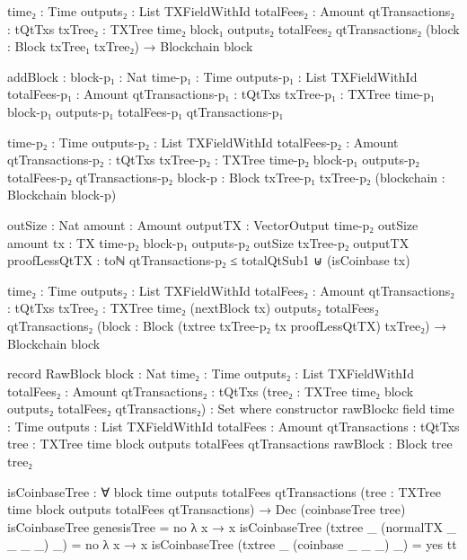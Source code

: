 \documentclass{beamer}
\begin{document}
\begin{code}
            {time₂ : Time}
            {outputs₂ : List TXFieldWithId}
            {totalFees₂ : Amount}
            {qtTransactions₂ : tQtTxs}
            {txTree₂ : TXTree time₂ block₁ outputs₂ totalFees₂ qtTransactions₂}
            (block : Block txTree₁ txTree₂)
            → Blockchain block

          addBlock :
            {block-p₁ : Nat}
            {time-p₁ : Time}
            {outputs-p₁ : List TXFieldWithId}
            {totalFees-p₁ : Amount}
            {qtTransactions-p₁ : tQtTxs}
            {txTree-p₁ : TXTree time-p₁ block-p₁ outputs-p₁ totalFees-p₁ qtTransactions-p₁}

            {time-p₂ : Time}
            {outputs-p₂ : List TXFieldWithId}
            {totalFees-p₂ : Amount}
            {qtTransactions-p₂ : tQtTxs}
            {txTree-p₂ : TXTree time-p₂ block-p₁ outputs-p₂ totalFees-p₂ qtTransactions-p₂}
            {block-p : Block txTree-p₁ txTree-p₂}
            (blockchain : Blockchain block-p)

            {outSize : Nat}
            {amount : Amount}
            {outputTX : VectorOutput time-p₂ outSize amount}
            {tx : TX {time-p₂} {block-p₁} {outputs-p₂} {outSize} txTree-p₂ outputTX}
            {proofLessQtTX :
                toℕ qtTransactions-p₂ ≤ totalQtSub1
                ⊎
                (isCoinbase tx)}

            {time₂ : Time}
            {outputs₂ : List TXFieldWithId}
            {totalFees₂ : Amount}
            {qtTransactions₂ : tQtTxs}
            {txTree₂ : TXTree time₂ (nextBlock tx) outputs₂ totalFees₂ qtTransactions₂}
            (block : Block (txtree txTree-p₂ tx proofLessQtTX) txTree₂)
            → Blockchain block

      record RawBlock
        {block : Nat}
        {time₂ : Time}
        {outputs₂ : List TXFieldWithId}
        {totalFees₂ : Amount}
        {qtTransactions₂ : tQtTxs}
        (tree₂ : TXTree time₂ block outputs₂ totalFees₂ qtTransactions₂)
        : Set where
        constructor rawBlockc
        field
          {time}           : Time
          {outputs}        : List TXFieldWithId
          {totalFees}      : Amount
          {qtTransactions} : tQtTxs
          {tree}           : TXTree time block outputs totalFees qtTransactions
          rawBlock         : Block tree tree₂

      isCoinbaseTree : ∀
        {block time outputs totalFees qtTransactions}
        (tree : TXTree time block outputs totalFees qtTransactions)
        → Dec (coinbaseTree tree)
      isCoinbaseTree genesisTree = no λ x → x
      isCoinbaseTree (txtree _ (normalTX _ _ _ _) _) = no λ x → x
      isCoinbaseTree (txtree _ (coinbase _ _ _) _) = yes tt


\end{code}
\end{document}
